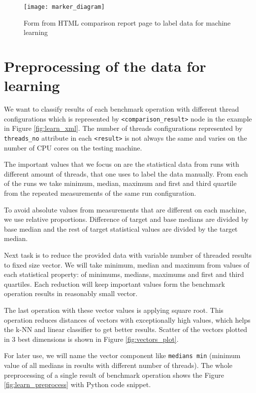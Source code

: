 \begin{figure}
  \centering
  \texttt{[image: marker\_diagram]}
  \caption{Form from HTML comparison report page to label data for machine learning}
  \label{fig:marker_diagram}
\end{figure}

\section{Preprocessing of the data for learning} \label{sec:learn_preprocess}
We want to classify results of each benchmark operation with
different thread configurations which is represented by
\texttt{<comparison\_result>} node in the example in Figure \ref{fig:learn_xml}.
The number of threads configurations represented by \texttt{threads\_no}
attribute in each \texttt{<result>} is not always the same and varies on the
number of CPU cores on the testing machine.

The important values that we focus on are the statistical data from runs with
different amount of threads, that one uses to label the data manually. From
each of the runs we take minimum, median, maximum and first and third quartile
from the repeated measurements of the same run configuration.

To avoid absolute values from measurements that are different on each machine,
we use relative proportions. Difference of target and base medians are
divided by base median and the rest of target statistical values are divided
by the target median.

Next task is to reduce the provided data with variable number of threaded results
to fixed size vector. We will take minimum, median and maximum from values of
each statistical property: of minimums, medians, maximums and first and third
quartiles. Each reduction will keep important values form the benchmark
operation results in reasonably small vector.

The last operation with these vector values is applying square root. This
operation reduces distances of vectors with exceptionally high values, which
helps the k-NN and linear classifier to get better results. Scatter of the
vectors plotted in 3 best dimensions is shown in Figure \ref{fig:vectors_plot}.

For later use, we will name the vector component like \texttt{medians min} 
(minimum value of all medians in results with different number of threads).
The whole preprocessing of a single result of benchmark operation shows the
Figure \ref{fig:learn_preprocess} with Python code snippet.

